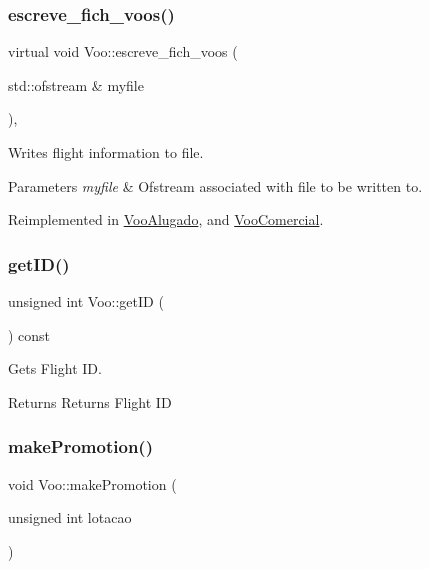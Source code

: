 \subsubsection{\texorpdfstring{escreve\+\_\+fich\+\_\+voos()}{escreve\_fich\_voos()}}
{\footnotesize\ttfamily virtual void Voo\+::escreve\+\_\+fich\+\_\+voos (\begin{DoxyParamCaption}\item[{std\+::ofstream \&}]{myfile }\end{DoxyParamCaption})\hspace{0.3cm}{\ttfamily [inline]}, {\ttfamily [virtual]}}



Writes flight information to file. 


\begin{DoxyParams}{Parameters}
{\em myfile} & Ofstream associated with file to be written to. \\
\hline
\end{DoxyParams}


Reimplemented in \hyperlink{class_voo_alugado_a183aa2faff077d9a01b54023c1cf3032}{Voo\+Alugado}, and \hyperlink{class_voo_comercial_a813f44820fa19d9cecf38e1dfcd28c2d}{Voo\+Comercial}.

\mbox{\label{class_voo_af1d8170af6f6747d4010d2f16d6c64f1}} 
\subsubsection{\texorpdfstring{get\+I\+D()}{getID()}}
{\footnotesize\ttfamily unsigned int Voo\+::get\+ID (\begin{DoxyParamCaption}{ }\end{DoxyParamCaption}) const}



Gets Flight ID. 

\begin{DoxyReturn}{Returns}
Returns Flight ID 
\end{DoxyReturn}
\mbox{\label{class_voo_abe4f7816ae9132314e0288e7b8a077d8}} 
\subsubsection{\texorpdfstring{make\+Promotion()}{makePromotion()}}
{\footnotesize\ttfamily void Voo\+::make\+Promotion (\begin{DoxyParamCaption}\item[{unsigned int}]{lotacao }\end{DoxyParamCaption})\hspace{0.3cm}{\ttfamily [virtual]}}



